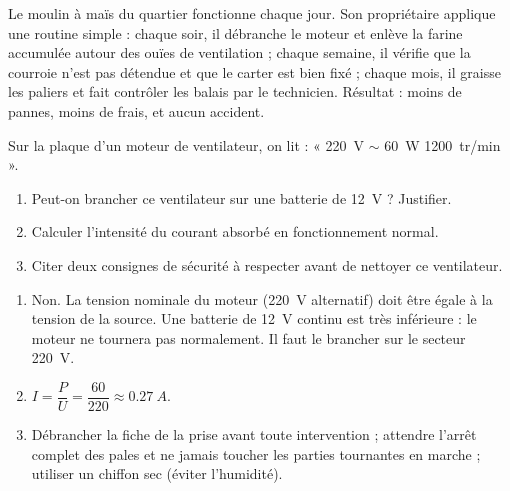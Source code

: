 \documentclass[11pt]{article}
\begin{document}
\begin{exemplebox}
Le moulin à maïs du quartier fonctionne chaque jour. Son propriétaire applique une routine simple : chaque soir, il débranche le moteur et enlève la farine accumulée autour des ouïes de ventilation ; chaque semaine, il vérifie que la courroie n'est pas détendue et que le carter est bien fixé ; chaque mois, il graisse les paliers et fait contrôler les balais par le technicien. Résultat : moins de pannes, moins de frais, et aucun accident.
\end{exemplebox}

\begin{exercice}
Sur la plaque d'un moteur de ventilateur, on lit : « \SI{220}{V} $\sim$ \SI{60}{W} \SI{1200}{tr/min} ».
\begin{enumerate}
\item Peut-on brancher ce ventilateur sur une batterie de \SI{12}{V} ? Justifier.
\item Calculer l'intensité du courant absorbé en fonctionnement normal.
\item Citer deux consignes de sécurité à respecter avant de nettoyer ce ventilateur.
\end{enumerate}
\end{exercice}

\begin{corrige}
\begin{enumerate}
\item Non. La tension nominale du moteur (\SI{220}{V} alternatif) doit être égale à la tension de la source. Une batterie de \SI{12}{V} continu est très inférieure : le moteur ne tournera pas normalement. Il faut le brancher sur le secteur \SI{220}{V}.
\item $I = \dfrac{P}{U} = \dfrac{60}{220} \approx \SI{0,27}{A}$.
\item Débrancher la fiche de la prise avant toute intervention ; attendre l'arrêt complet des pales et ne jamais toucher les parties tournantes en marche ; utiliser un chiffon sec (éviter l'humidité).
\end{enumerate}
\end{corrige}
\end{document}
